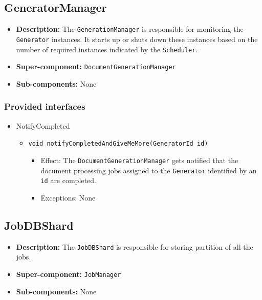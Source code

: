 \documentclass[a4paper,10pt]{article}
\begin{document}
\subsection{GeneratorManager}
\begin{itemize}
    \item \textbf{Description:} The \texttt{GenerationManager} is responsible for monitoring the \texttt{Generator} instances. It starts up or shuts down these instances based on the number of required instances indicated by the \texttt{Scheduler}.
    \item \textbf{Super-component:}  \texttt{DocumentGenerationManager}
    \item \textbf{Sub-components:} None
\end{itemize}

\subsubsection*{Provided interfaces}
\begin{itemize}
    \item NotifyCompleted
    \begin{itemize}
        \item \texttt{void notifyCompletedAndGiveMeMore(GeneratorId id)}
        \begin{itemize}
            \item Effect: The \texttt{DocumentGenerationManager} gets notified that the document processing jobs assigned to the \texttt{Generator} identified by an \texttt{id} are completed. 
            \item Exceptions: None
        \end{itemize}
    \end{itemize}
\end{itemize}

\subsection{JobDBShard}
\begin{itemize}
    \item \textbf{Description:} The \texttt{JobDBShard} is responsible for storing partition of all the jobs.
    \item \textbf{Super-component:} \texttt{JobManager}
    \item \textbf{Sub-components:} None
\end{itemize}
\end{document}
